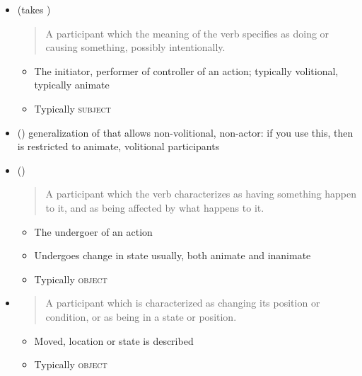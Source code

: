 \documentclass[headrule,footrule]{foils}
\begin{document}
\begin{itemize}
\item {} (takes )
  \begin{quote}
    A participant which the meaning of the verb specifies as doing or causing something,
    possibly intentionally. 
  \end{quote}
  \begin{itemize}
  \item The initiator, performer of controller of an action; typically volitional, typically animate
  \item Typically \textsc{subject}
  \end{itemize}
  \begin{exe}
      \ex{}
      \ex{}
      \ex{}
    \end{exe}
\item () generalization of  that allows non-volitional, non-actor:
   if you use this, then  is restricted to animate, volitional participants
\newpage
\item  {} ()
  \begin{quote}
    A participant which the verb characterizes as having something
    happen to it, and as being affected by what happens to it.
  \end{quote}
  \begin{itemize}
  \item The undergoer of an action
  \item  Undergoes change in state usually, both animate and 
    inanimate
  \item Typically \textsc{object}
  \end{itemize}
  \begin{exe}
    \ex{}
    \ex{}
    \ex {}
    \ex{}
    \ex{}
  \end{exe}
\newpage
\item  {}
  \begin{quote}
     A participant which is characterized as changing its position or condition, or as
being in a state or position. 
  \end{quote}
  \begin{itemize}
  \item  Moved, location or state is described
  \item Typically \textsc{object}
\end{itemize}
\begin{exe}
  \ex {}
  \ex {}
  \ex {}
  \ex {}
\end{exe}
\newpage


\end{itemize}
\end{document}
